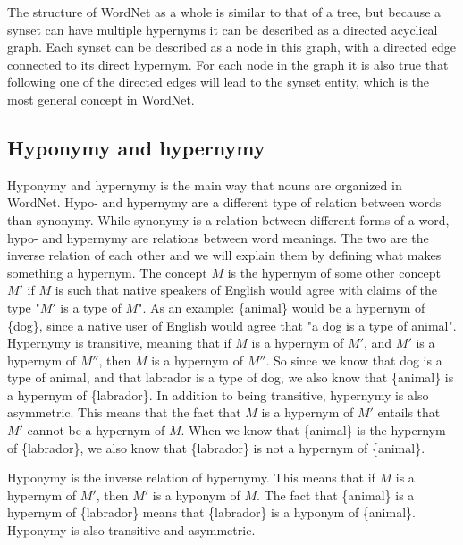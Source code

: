The structure of WordNet as a whole is similar to that of a tree,
but because a synset can have multiple hypernyms it can be described as a directed acyclical graph.
Each synset can be described as a node in this graph, with a directed edge connected to its direct hypernym.
For each node in the graph it is also true that following one of the directed edges will lead to the synset entity,
which is the most general concept in WordNet.

\subsection{Hyponymy and hypernymy}
\label{Hypernymy}
Hyponymy and hypernymy is the main way that nouns are organized in WordNet.
Hypo- and hypernymy are a different type of relation between words than synonymy.
While synonymy is a relation between different forms of a word,
hypo- and hypernymy are relations between word meanings.
The two are the inverse relation of each other and we will explain them by defining what makes something a hypernym.
The concept $M$ is the hypernym of some other concept $M'$ if $M$ is such that native speakers of English would agree
with claims of the type "$M'$ is a type of $M$".
As an example: \{animal\} would be a hypernym of \{dog\},
since a native user of English would agree that "a dog is a type of animal".
Hypernymy is transitive, meaning that if $M$ is a hypernym of $M'$, and $M'$ is a hypernym of $M''$,
then $M$ is a hypernym of $M''$.
So since we know that dog is a type of animal, and that labrador is a type of dog,
we also know that \{animal\} is a hypernym of \{labrador\}.
In addition to being transitive, hypernymy is also asymmetric.
This means that the fact that $M$ is a hypernym of $M'$ entails that $M'$ cannot be a hypernym of $M$.
When we know that \{animal\} is the hypernym of \{labrador\},
we also know that \{labrador\} is not a hypernym of \{animal\}\citep{Miller1990}.

Hyponymy is the inverse relation of hypernymy.
This means that if $M$ is a hypernym of $M'$, then $M'$ is a hyponym of $M$.
The fact that \{animal\} is a hypernym of \{labrador\} means that \{labrador\} is a hyponym of \{animal\}.
Hyponymy is also transitive and asymmetric\citep{Miller1990}.


